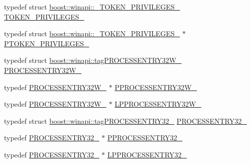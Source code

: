 \begin{DoxyCompactItemize}
\item 
typedef struct \mbox{\hyperlink{structboost_1_1winapi_1_1___t_o_k_e_n___p_r_i_v_i_l_e_g_e_s__}{boost\+::winapi\+::\+\_\+\+T\+O\+K\+E\+N\+\_\+\+P\+R\+I\+V\+I\+L\+E\+G\+E\+S\+\_\+}} \mbox{\hyperlink{namespaceboost_1_1winapi_a2f67ef0e5761d692b8782a76d1d9d5da}{T\+O\+K\+E\+N\+\_\+\+P\+R\+I\+V\+I\+L\+E\+G\+E\+S\+\_\+}}
\item 
typedef struct \mbox{\hyperlink{structboost_1_1winapi_1_1___t_o_k_e_n___p_r_i_v_i_l_e_g_e_s__}{boost\+::winapi\+::\+\_\+\+T\+O\+K\+E\+N\+\_\+\+P\+R\+I\+V\+I\+L\+E\+G\+E\+S\+\_\+}} $\ast$ \mbox{\hyperlink{namespaceboost_1_1winapi_a9d5f985cca2c6c8adc061e489ff44b99}{P\+T\+O\+K\+E\+N\+\_\+\+P\+R\+I\+V\+I\+L\+E\+G\+E\+S\+\_\+}}
\item 
typedef struct \mbox{\hyperlink{structboost_1_1winapi_1_1tag_p_r_o_c_e_s_s_e_n_t_r_y32_w__}{boost\+::winapi\+::tag\+P\+R\+O\+C\+E\+S\+S\+E\+N\+T\+R\+Y32\+W\+\_\+}} \mbox{\hyperlink{namespaceboost_1_1winapi_a524d09b856a289b2f93dd0bc85336de7}{P\+R\+O\+C\+E\+S\+S\+E\+N\+T\+R\+Y32\+W\+\_\+}}
\item 
typedef \mbox{\hyperlink{namespaceboost_1_1winapi_a524d09b856a289b2f93dd0bc85336de7}{P\+R\+O\+C\+E\+S\+S\+E\+N\+T\+R\+Y32\+W\+\_\+}} $\ast$ \mbox{\hyperlink{namespaceboost_1_1winapi_ada8f466631e6dd856b27871deb8374d7}{P\+P\+R\+O\+C\+E\+S\+S\+E\+N\+T\+R\+Y32\+W\+\_\+}}
\item 
typedef \mbox{\hyperlink{namespaceboost_1_1winapi_a524d09b856a289b2f93dd0bc85336de7}{P\+R\+O\+C\+E\+S\+S\+E\+N\+T\+R\+Y32\+W\+\_\+}} $\ast$ \mbox{\hyperlink{namespaceboost_1_1winapi_a1f7c58e0beb293620d94a1a65c5d6416}{L\+P\+P\+R\+O\+C\+E\+S\+S\+E\+N\+T\+R\+Y32\+W\+\_\+}}
\item 
typedef struct \mbox{\hyperlink{structboost_1_1winapi_1_1tag_p_r_o_c_e_s_s_e_n_t_r_y32__}{boost\+::winapi\+::tag\+P\+R\+O\+C\+E\+S\+S\+E\+N\+T\+R\+Y32\+\_\+}} \mbox{\hyperlink{namespaceboost_1_1winapi_aa148b1a2cd4a16c95b05b56d8b31cc4c}{P\+R\+O\+C\+E\+S\+S\+E\+N\+T\+R\+Y32\+\_\+}}
\item 
typedef \mbox{\hyperlink{namespaceboost_1_1winapi_aa148b1a2cd4a16c95b05b56d8b31cc4c}{P\+R\+O\+C\+E\+S\+S\+E\+N\+T\+R\+Y32\+\_\+}} $\ast$ \mbox{\hyperlink{namespaceboost_1_1winapi_a8e036e2db2c31c9312751ac1b4fc1684}{P\+P\+R\+O\+C\+E\+S\+S\+E\+N\+T\+R\+Y32\+\_\+}}
\item 
typedef \mbox{\hyperlink{namespaceboost_1_1winapi_aa148b1a2cd4a16c95b05b56d8b31cc4c}{P\+R\+O\+C\+E\+S\+S\+E\+N\+T\+R\+Y32\+\_\+}} $\ast$ \mbox{\hyperlink{namespaceboost_1_1winapi_a5c37ed8a14a5045b26f8391f2c7bab84}{L\+P\+P\+R\+O\+C\+E\+S\+S\+E\+N\+T\+R\+Y32\+\_\+}}
\end{DoxyCompactItemize}
